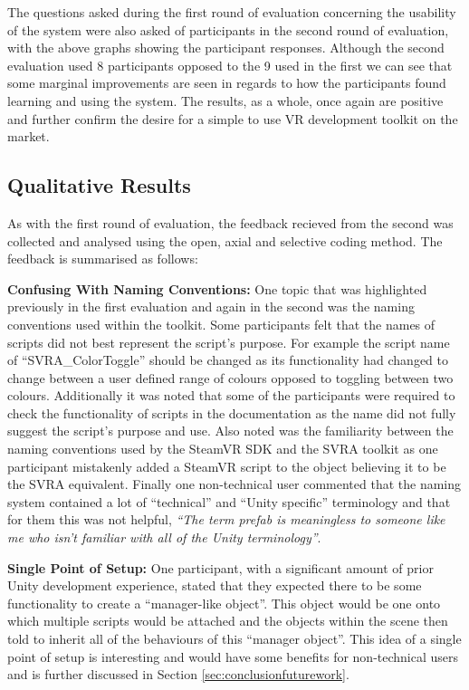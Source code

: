 \documentclass{l4proj}
\begin{document}
The questions asked during the first round of evaluation concerning the usability of the system were also asked of participants in the second round of evaluation, with the above graphs showing the participant responses. Although the second evaluation used 8 participants opposed to the 9 used in the first we can see that some marginal improvements are seen in regards to how the participants found learning and using the system. The results, as a whole, once again are positive and further confirm the desire for a simple to use VR development toolkit on the market. 

\subsection{Qualitative Results}
\label{sec:evlauationqual2}
As with the first round of evaluation, the feedback recieved from the second was collected and analysed using the open, axial and selective coding method. The feedback is summarised as follows:

\textbf{Confusing With Naming Conventions:} One topic that was highlighted previously in the first evaluation and again in the second was the naming conventions used within the toolkit. Some participants felt that the names of scripts did not best represent the script's purpose. For example the script name of ``SVRA\_ColorToggle'' should be changed as its functionality had changed to change between a user defined range of colours opposed to toggling between two colours. Additionally it was noted that some of the participants were required to check the functionality of scripts in the documentation as the name did not fully suggest the script's purpose and use. Also noted was the familiarity between the naming conventions used by the SteamVR SDK and the SVRA toolkit as one participant mistakenly added a SteamVR script to the object believing it to be the SVRA equivalent. Finally one non-technical user commented that the naming system contained a lot of ``technical'' and ``Unity specific'' terminology and that for them this was not helpful, \textit{``The term prefab is meaningless to someone like me who isn't familiar with all of the Unity terminology''}.

\textbf{Single Point of Setup:} One participant, with a significant amount of prior Unity development experience, stated that they expected there to be some functionality to create a ``manager-like object''. This object would be one onto which multiple scripts would be attached and the objects within the scene then told to inherit all of the behaviours of this ``manager object''. This idea of a single point of setup is interesting and would have some benefits for non-technical users and is further discussed in Section \ref{sec:conclusionfuturework}.
\end{document}
